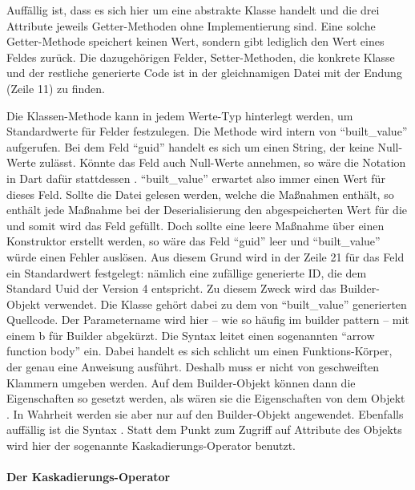 Auffällig ist, dass es sich hier um eine abstrakte Klasse handelt und die drei Attribute jeweils Getter-Methoden ohne Implementierung sind.
Eine solche Getter-Methode speichert keinen Wert, sondern gibt lediglich den Wert eines Feldes zurück.
Die dazugehörigen Felder,  Setter-Methoden, die konkrete Klasse und der restliche generierte Code ist in der gleichnamigen Datei mit der Endung  (Zeile 11) zu finden.

Die Klassen-Methode  kann in jedem Werte-Typ hinterlegt werden, um Standardwerte für Felder festzulegen.
Die Methode wird intern von \enquote{built_value} aufgerufen.
Bei dem Feld \enquote{guid} handelt es sich um einen String, der keine Null-Werte zulässt.
Könnte das Feld auch Null-Werte annehmen, so wäre die Notation in Dart dafür stattdessen . \enquote{built_value} erwartet also immer einen Wert für dieses Feld. Sollte die Datei gelesen werden, welche die Maßnahmen enthält, so enthält jede Maßnahme bei der Deserialisierung den abgespeicherten Wert für die  und somit wird das Feld gefüllt. Doch sollte eine leere Maßnahme über einen Konstruktor erstellt werden, so wäre das Feld \enquote{guid} leer und \enquote{built_value} würde einen Fehler auslösen. Aus diesem Grund wird in der Zeile 21 für das Feld  ein Standardwert festgelegt: nämlich eine zufällige generierte ID, die dem Standard Uuid der Version 4 entspricht.
Zu diesem Zweck wird das Builder-Objekt verwendet.
Die Klasse  gehört dabei zu dem von \enquote{built_value} generierten Quellcode.
Der Parametername wird hier – wie so häufig im builder pattern – mit einem b für Builder abgekürzt.
Die Syntax \IC{=>} leitet  einen sogenannten \enquote{arrow function body} ein.
Dabei handelt es sich schlicht um einen Funktions-Körper, der genau eine Anweisung ausführt. Deshalb muss er nicht von geschweiften Klammern umgeben werden.
Auf dem Builder-Objekt können dann die Eigenschaften so gesetzt werden, als wären sie die Eigenschaften von dem Objekt .
In Wahrheit werden sie aber nur auf den Builder-Objekt angewendet.  Ebenfalls auffällig ist die Syntax .  Statt dem Punkt zum Zugriff auf Attribute des Objekts wird hier der sogenannte Kaskadierungs-Operator benutzt.

\paragraph{Der Kaskadierungs-Operator}

